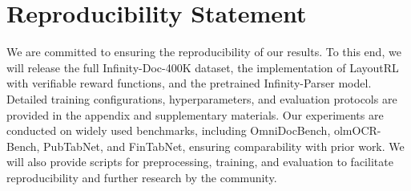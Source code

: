 







\section{Reproducibility Statement}

We are committed to ensuring the reproducibility of our results. 
To this end, we will release the full Infinity-Doc-400K dataset, the implementation of LayoutRL with verifiable reward functions, and the pretrained Infinity-Parser model. 
Detailed training configurations, hyperparameters, and evaluation protocols are provided in the appendix and supplementary materials. 
Our experiments are conducted on widely used benchmarks, including OmniDocBench, olmOCR-Bench, PubTabNet, and FinTabNet, ensuring comparability with prior work. 
We will also provide scripts for preprocessing, training, and evaluation to facilitate reproducibility and further research by the community.




